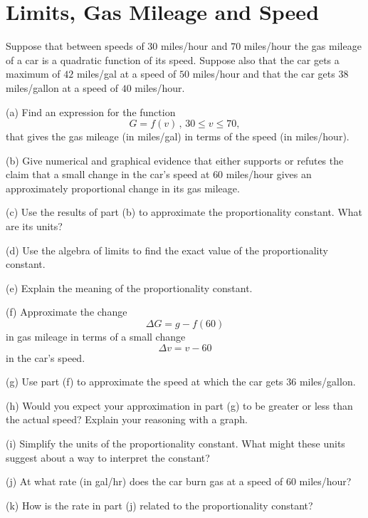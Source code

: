 \documentclass{ximera}
\begin{document}
\section{Limits, Gas Mileage and Speed}

\begin{example}  \label{Ex:34t45rtg}
Suppose that between speeds of $30$ miles/hour and $70$ miles/hour the gas mileage of a car is a quadratic function of its speed. 
Suppose also that the car gets a maximum of $42$ miles/gal at a speed of $50$ miles/hour and that the car gets $38$ miles/gallon at a speed of $40$ miles/hour.

(a) Find an expression for the function
\[
    G = f(v) \, , \, 30\leq v \leq 70 ,
\]
that gives the gas mileage (in miles/gal) in terms of the speed (in miles/hour).

(b) Give numerical  and graphical evidence that either supports or refutes the claim that a small change in the car's speed at $60$ miles/hour gives an approximately proportional change in its gas mileage.

(c) Use the results of part (b) to approximate the proportionality constant. What are its units?

(d) Use the algebra of limits to find the exact value of the proportionality constant.

(e) Explain the meaning of the proportionality constant.

(f) Approximate the change
\[
    \Delta G = g - f(60)
\]
in gas mileage in terms of a small change
\[
  \Delta v = v - 60
\]
in the car's speed.

(g) Use part (f) to approximate the speed at which the car gets $36$ miles/gallon. 

(h) Would you expect your approximation in part (g) to be greater or less than the actual speed? Explain your reasoning with a graph.

(i) Simplify the units of the proportionality constant. What might these units suggest about a way to interpret the constant?

(j) At what rate (in gal/hr) does the car burn gas at a speed of $60$ miles/hour? 

(k) How is the rate in part (j) related to the proportionality constant?

\end{example}
\end{document}
